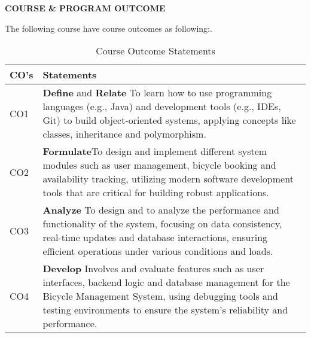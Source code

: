 \vspace*{1.5cm} 
\setlength{\headheight}{14pt}
\begin{center}
	{\LARGE \bf COURSE \& PROGRAM OUTCOME}\\
\vspace*{1.5cm} 
\begin{flushleft}
The following course have course outcomes as following:.
\end{flushleft}

\begin{table}[h!]
\centering
\caption{Course Outcome Statements}
\vspace{0.1cm} %
\begin{tabular}{|p{}|p{}|}
\hline
\textbf{CO's} & \textbf{Statements} \\
\hline
CO1 & \textbf{Define} and \textbf{Relate} To learn how to use programming languages (e.g., Java) and development tools (e.g., IDEs, Git) to build object-oriented systems, applying concepts like classes, inheritance  and polymorphism.
 \\
\hline
CO2 & \textbf{Formulate}To design and implement different system modules such as user management, bicycle booking and availability tracking, utilizing modern software development tools that are critical for building robust applications.
 \\
\hline
CO3 & \textbf{Analyze} To design and to analyze the performance and functionality of the system, focusing on data consistency, real-time updates and database interactions, ensuring efficient operations under various conditions and loads. \\
\hline
CO4 & \textbf{Develop} Involves and evaluate features such as user interfaces, backend logic and database management for the Bicycle Management System, using debugging tools and testing environments to ensure the system’s reliability and performance. \\
\hline
\end{tabular}
\end{table}


\end{center}
